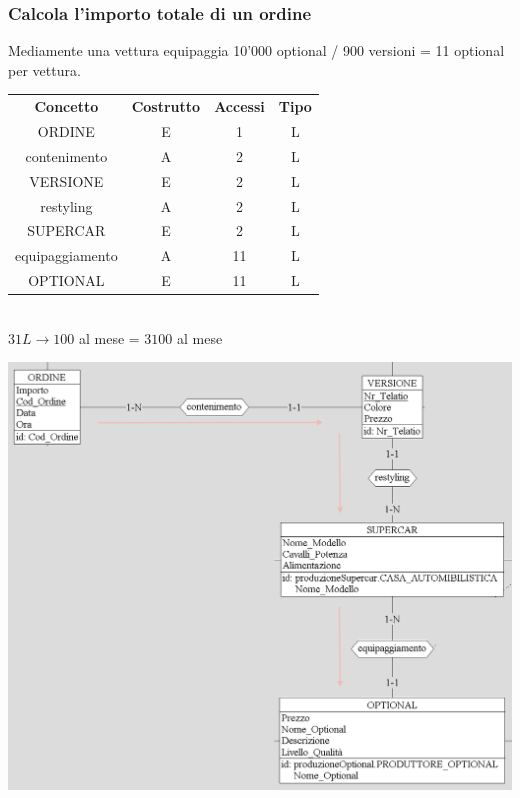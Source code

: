 \documentclass[12pt]{article}
\begin{document}
\subsubsection{Calcola l'importo totale di un ordine} 

Mediamente una vettura equipaggia 10'000 optional / 900 versioni = 11 optional per vettura.

\begin{table}[H]
    \centering
    \begin{tabular}{c c c c}
        \rowcolor{red!20!}
        \textbf{Concetto} & \textbf{Costrutto} & \textbf{Accessi} &
        \textbf{Tipo}\\
        ORDINE & E & 1 & L \\
        contenimento & A & 2 & L \\
        VERSIONE & E & 2 & L \\
        restyling & A & 2 & L \\
        SUPERCAR & E & 2 & L \\
        equipaggiamento & A & 11 & L \\
        OPTIONAL & E & 11 & L \\
    \end{tabular}\\
    \( 31L \rightarrow 100 \) al mese = \( 3100 \) al mese
\end{table}

\begin{center}
    \includegraphics[scale=0.66]{images/navigationSchemes/calcolaOrdine.png}
\end{center}
\end{document}
